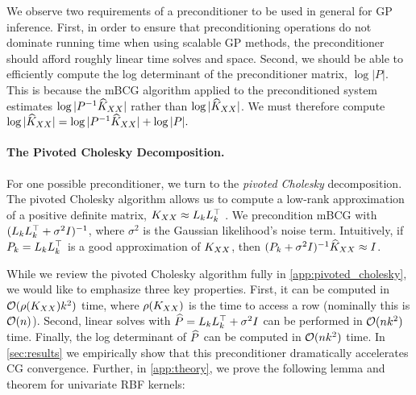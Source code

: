 We observe two requirements of a preconditioner to be used in general for GP inference. First, in order to ensure that preconditioning operations do not dominate running time when using scalable GP methods, the preconditioner should afford roughly linear time solves and space. Second, we should be able to efficiently compute the log determinant of the preconditioner matrix, $\log \vert P \vert$. This is because the mBCG algorithm applied to the preconditioned system estimates $\log \vert P^{-1}\widehat{K}_{XX} \vert$ rather than $\log \vert \widehat{K}_{XX} \vert$. We must therefore compute
$
  \label{eq:logdet_adjusted}
  \log \vert \widehat{K}_{XX} \vert = \log \vert P^{-1}\widehat{K}_{XX} \vert + \log \vert P \vert.
$

\paragraph{The Pivoted Cholesky Decomposition.}
For one possible preconditioner, we turn to the \emph{pivoted Cholesky} decomposition.
The pivoted Cholesky algorithm allows us to compute a low-rank approximation of a positive definite matrix, $K_{XX} \approx L_{k} L_{k}^{\top}$ \cite{harbrecht2012low}.
We precondition mBCG with $(L_k L_k^\top + \sigma^2 I)^{-1}$, where $\sigma^2$ is the Gaussian likelihood's noise term.
Intuitively, if $P_{k}=L_{k}L_{k}^{\top}$ is a good approximation of $K_{XX}$, then $(P_{k} + \sigma^{2}I)^{-1}\widehat{K}_{XX} \approx I$.

While we review the pivoted Cholesky algorithm fully in \cref{app:pivoted_cholesky}, we would like to emphasize three key properties. First, it can be computed in $\bigo{\row{\bK_{\bX\bX}}k^{2}}$ time, where $\rho ( K_{XX} )$ is the time to access a row (nominally this is $\bigo{n}$).
Second, linear solves with $\widehat{P} = L_{k}L_{k}^{\top} + \sigma^{2}I$ can be performed in $\bigo{nk^{2}}$ time. Finally, the log determinant of $\widehat{P}$ can be computed in $\bigo{nk^{2}}$ time.
In \cref{sec:results} we empirically show that this preconditioner dramatically accelerates CG convergence.
Further, in \cref{app:theory}, we prove the following lemma and theorem for univariate RBF kernels:

